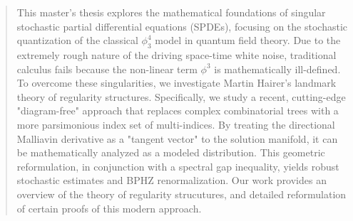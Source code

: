 \documentclass[12pt, a4paper]{report}
\theoremstyle{definition}
\begin{document}
\begin{abstract}
This master’s thesis explores the mathematical foundations of singular stochastic partial differential equations (SPDEs), 
focusing on the stochastic quantization of the classical $\phi^4_3$ model in quantum field theory. 
Due to the extremely rough nature of the driving space-time white noise, traditional calculus fails because the non-linear term $\phi^3$ is mathematically ill-defined. 
To overcome these singularities, we investigate Martin Hairer's landmark theory of regularity structures. Specifically, we study a recent, cutting-edge "diagram-free" approach that replaces complex combinatorial trees with a more parsimonious index set of multi-indices. 
By treating the directional Malliavin derivative as a "tangent vector" to the solution manifold, it can be mathematically analyzed as a modeled distribution. 
This geometric reformulation, in conjunction with a spectral gap inequality, yields robust stochastic estimates and BPHZ renormalization. 
Our work provides an overview of the theory of regularity strucutures, and detailed reformulation of certain proofs of this modern approach. 
\end{abstract}

\tableofcontents

%
% 
% 
% 
% 
% 
% 
% 
% 
% 



\printbibliography
\end{document}

